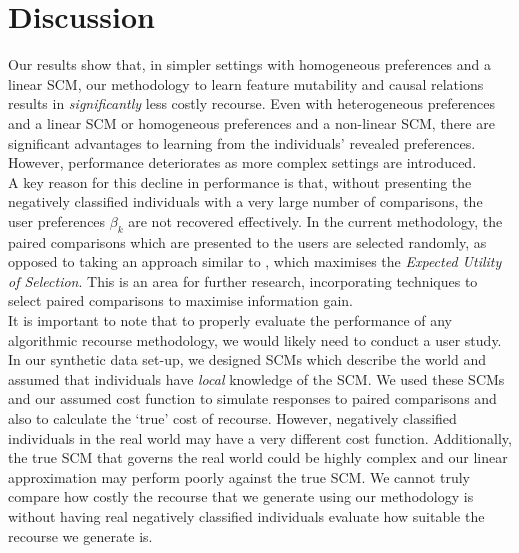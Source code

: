\section{Discussion} \label{section:discussion}

Our results show that, in simpler settings with homogeneous preferences and a linear SCM, our methodology to learn feature mutability and causal relations results in \textit{significantly} less costly recourse. Even with heterogeneous preferences and a linear SCM or homogeneous preferences and a non-linear SCM, there are significant advantages to learning from the individuals' revealed preferences. However, performance deteriorates as more complex settings are introduced. \\

A key reason for this decline in performance is that, without presenting the negatively classified individuals with a very large number of comparisons, the user preferences $\beta_k$ are not recovered effectively. In the current methodology, the paired comparisons which are presented to the users are selected randomly, as opposed to taking an approach similar to \textcite{detoniPersonalizedAlgorithmicRecourse2023}, which maximises the \textit{Expected Utility of Selection}. This is an area for further research, incorporating techniques to select paired comparisons to maximise information gain.\\

It is important to note that to properly evaluate the performance of any algorithmic recourse methodology, we would likely need to conduct a user study. In our synthetic data set-up, we designed SCMs which describe the world and assumed that individuals have \textit{local} knowledge of the SCM. We used these SCMs and our assumed cost function to simulate responses to paired comparisons and also to calculate the `true' cost of recourse. However, negatively classified individuals in the real world may have a very different cost function. Additionally, the true SCM that governs the real world could be highly complex and our linear approximation may perform poorly against the true SCM. We cannot truly compare how costly the recourse that we generate using our methodology is without having real negatively classified individuals evaluate how suitable the recourse we generate is.